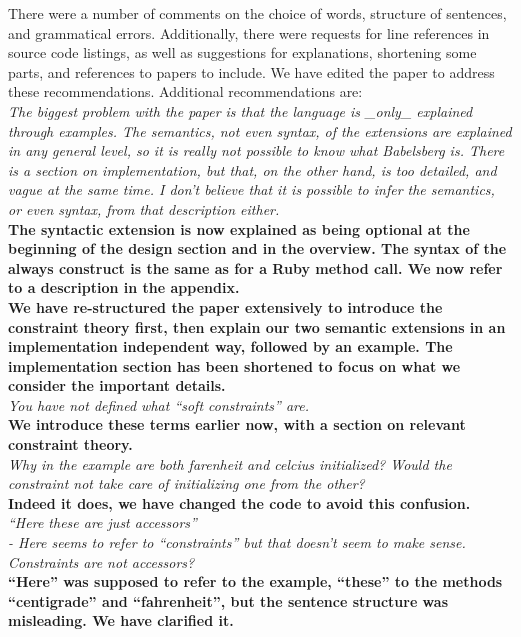 \documentclass[english]{article}
\begin{document}
There were a number of comments on the choice of words, structure of
sentences, and grammatical errors. Additionally, there were requests
for line references in source code listings, as well as suggestions
for explanations, shortening some parts, and references to papers to
include. We have edited the paper to address these recommendations.
Additional recommendations are: \\

\textit{The biggest problem with the paper is that the language is
  \_only\_ explained through examples. The semantics, not even syntax,
  of the extensions are explained in any general level, so it is
  really not possible to know what Babelsberg is.  There is a section
  on implementation, but that, on the other hand, is too detailed, and
  vague at the same time. I don't believe that it is possible to infer
  the semantics, or even syntax, from that description either.}\\
\textbf{The syntactic extension is now explained as being optional at
  the beginning of the design section and in the overview. The syntax
  of the always construct is the same as for a Ruby method call. We
  now refer to a description in the appendix.\\
  We have re-structured the paper extensively to introduce the
  constraint theory
  first, then explain our two semantic extensions in an implementation
  independent way, followed by an example. The implementation section has
  been shortened to focus on what we
  consider the important details.}\\

\textit{You have not defined what ``soft constraints'' are.}\\
\textbf{We introduce these terms earlier now, with a section on
  relevant constraint theory.}\\

\textit{Why in the example are both farenheit and celcius initialized?
  Would the constraint not take care of initializing one from the
  other?}\\
\textbf{Indeed it does, we have changed the code to avoid this
  confusion.}\\

\textit{``Here these are just accessors''\\
  - Here seems to refer to ``constraints'' but that doesn't seem to make
  sense.  Constraints are not accessors?}\\
\textbf{``Here'' was supposed to refer to the example, ``these'' to
  the methods ``centigrade'' and ``fahrenheit'', but the sentence
  structure was misleading. We have clarified it.}\\
\end{document}
